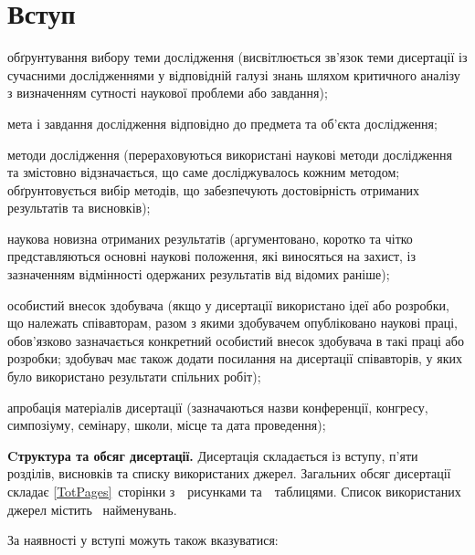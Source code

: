 \chapter*{Вступ}							%

обґрунтування вибору теми дослідження (висвітлюється зв’язок теми дисертації із сучасними дослідженнями у відповідній галузі знань шляхом критичного аналізу з визначенням сутності наукової проблеми або завдання);

мета і завдання дослідження відповідно до предмета та об’єкта дослідження;

методи дослідження (перераховуються використані наукові методи дослідження та змістовно відзначається, що саме досліджувалось кожним методом; обґрунтовується вибір методів, що забезпечують достовірність отриманих результатів та висновків);

наукова новизна отриманих результатів (аргументовано, коротко та чітко представляються основні наукові положення, які виносяться на захист, із зазначенням відмінності одержаних результатів від відомих раніше);

особистий внесок здобувача (якщо у дисертації використано ідеї або розробки, що належать співавторам, разом з якими здобувачем опубліковано наукові праці, обов’язково зазначається конкретний особистий внесок здобувача в такі праці або розробки; здобувач має також додати посилання на дисертації співавторів, у яких було використано результати спільних робіт);

апробація матеріалів дисертації (зазначаються назви конференції, конгресу, симпозіуму, семінару, школи, місце та дата проведення);

\textbf{Cтруктура та обсяг дисертації.} Дисертація складається із вступу, п'яти розділів, висновків та списку використаних джерел.
Загальних обсяг дисертації складає
\ref*{TotPages}~сторінки з~\totalfigures{}~рисунками та~\totaltables{}~таблицями.
Список використаних джерел містить ~найменувань.
%



За наявності у вступі можуть також вказуватися:

